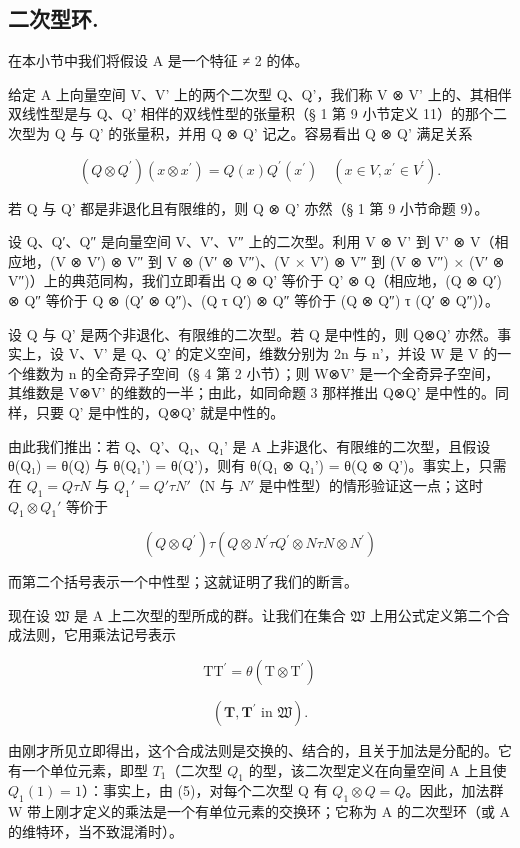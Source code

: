 \subsection{二次型环.}

在本小节中我们将假设 A 是一个特征 ≠ 2 的体。

  给定 A 上向量空间 V、V' 上的两个二次型 Q、Q'，我们称 V ⊗ V' 上的、其相伴双线性型是与 Q、Q' 相伴的双线性型的张量积（§ 1 第 9 小节定义 11）的那个二次型为 Q 与 Q' 的张量积，并用 Q ⊗ Q' 记之。容易看出 Q ⊗ Q' 满足关系

\[
(Q \otimes Q ^ {\prime}) (x \otimes x ^ {\prime}) = Q (x) Q ^ {\prime} (x ^ {\prime}) \quad (x \in V, x ^ {\prime} \in V ^ {\prime}).\tag{5}
\]

  若 Q 与 Q' 都是非退化且有限维的，则 Q ⊗ Q' 亦然（§ 1 第 9 小节命题 9）。

  设 Q、Q′、Q″ 是向量空间 V、V′、V″ 上的二次型。利用 V ⊗ V' 到 V' ⊗ V（相应地，(V ⊗ V′) ⊗ V″ 到 V ⊗ (V′ ⊗ V″)、(V × V′) ⊗ V″ 到 (V ⊗ V″) × (V′ ⊗ V″)）上的典范同构，我们立即看出 Q ⊗ Q' 等价于 Q' ⊗ Q（相应地，(Q ⊗ Q′) ⊗ Q″ 等价于 Q ⊗ (Q′ ⊗ Q″)、(Q τ Q′) ⊗ Q″ 等价于 (Q ⊗ Q″) τ (Q′ ⊗ Q″)）。

  设 Q 与 Q' 是两个非退化、有限维的二次型。若 Q 是中性的，则 Q⊗Q' 亦然。事实上，设 V、V' 是 Q、Q' 的定义空间，维数分别为 2n 与 n'，并设 W 是 V 的一个维数为 n 的全奇异子空间（§ 4 第 2 小节）；则 W⊗V' 是一个全奇异子空间，其维数是 V⊗V' 的维数的一半；由此，如同命题 3 那样推出 Q⊗Q' 是中性的。同样，只要 Q' 是中性的，Q⊗Q' 就是中性的。

  由此我们推出：若 Q、Q'、Q₁、Q₁' 是 A 上非退化、有限维的二次型，且假设 θ(Q₁) = θ(Q) 与 θ(Q₁') = θ(Q')，则有 θ(Q₁ ⊗ Q₁') = θ(Q ⊗ Q')。事实上，只需在 \(Q_{1} = Q \tau N\) 与 \(Q_{1}' = Q' \tau N'\)（N 与 \(N'\) 是中性型）的情形验证这一点；这时 \(Q_{1} \otimes Q_{1}'\) 等价于

\[
(Q \otimes Q ^ {\prime}) \tau (Q \otimes N ^ {\prime} \tau Q ^ {\prime} \otimes N \tau N \otimes N ^ {\prime})
\]

而第二个括号表示一个中性型；这就证明了我们的断言。

  现在设 \(\mathfrak{W}\) 是 A 上二次型的型所成的群。让我们在集合 \(\mathfrak{W}\) 上用公式定义第二个合成法则，它用乘法记号表示

\[
\mathrm{TT} ^ {\prime} = \theta (\mathrm{T} \otimes \mathrm{T} ^ {\prime})\tag{6}
\]

\[
(\mathbf {T}, \mathbf {T} ^ {\prime} \text {   in   } \mathfrak {W}).
\]

  由刚才所见立即得出，这个合成法则是交换的、结合的，且关于加法是分配的。它有一个单位元素，即型 \(T_{1}\)（二次型 \(Q_{1}\) 的型，该二次型定义在向量空间 A 上且使 \(Q_{1}(1)=1\)）：事实上，由 (5)，对每个二次型 Q 有 \(Q_{1}\otimes Q=Q\)。因此，加法群 W 带上刚才定义的乘法是一个有单位元素的交换环；它称为 A 的二次型环（或 A 的维特环，当不致混淆时）。

